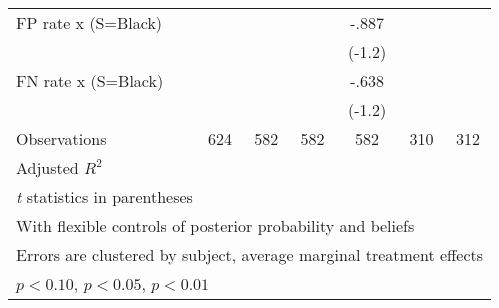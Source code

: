 \begin{table}[htbp]
\begin{tabular}{l*{6}{c}}
FP rate x (S=Black)&                  &                  &                  &    -.887         &                  &                  \\
                &                  &                  &                  &   (-1.2)         &                  &                  \\
FN rate x (S=Black)&                  &                  &                  &    -.638         &                  &                  \\
                &                  &                  &                  &   (-1.2)         &                  &                  \\
\hline
Observations    &      624         &      582         &      582         &      582         &      310         &      312         \\
Adjusted \(R^{2}\)&                  &                  &                  &                  &                  &                  \\
\hline\hline
\multicolumn{7}{l}{\footnotesize \textit{t} statistics in parentheses}\\
\multicolumn{7}{l}{\footnotesize With flexible controls of posterior probability and beliefs}\\
\multicolumn{7}{l}{\footnotesize Errors are clustered by subject, average marginal treatment effects}\\
\multicolumn{7}{l}{\footnotesize \sym{*} \(p<0.10\), \sym{**} \(p<0.05\), \sym{***} \(p<0.01\)}\\
\end{tabular}
\end{table}
